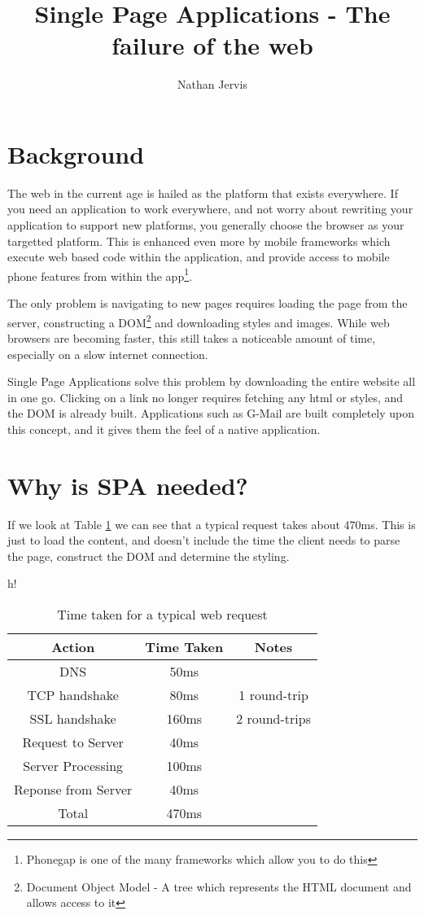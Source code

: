 \documentclass{article}[10pt]
\title{Single Page Applications - The failure of the web}
\author{Nathan Jervis}
\newcommand{\spa}{Single Page Application}
\begin{document}
\maketitle

\tableofcontents

\section{Background}

The web in the current age is hailed as the platform that exists everywhere. If you need an application to work everywhere, and not worry about rewriting your application to support new platforms, you generally choose the browser as your targetted platform. This is enhanced even more by mobile frameworks which execute web based code within the application, and provide access to mobile phone features from within the app\footnote{Phonegap is one of the many frameworks which allow you to do this}.

The only problem is navigating to new pages requires loading the page from the server, constructing a DOM\footnote{Document Object Model - A tree which represents the HTML document and allows access to it} and downloading styles and images. While web browsers are becoming faster, this still takes a noticeable amount of time, especially on a slow internet connection.

\spa s solve this problem by downloading the entire website all in one go. Clicking on a link no longer requires fetching any html or styles, and the DOM is already built. Applications such as G-Mail\cite{gmail} are built completely upon this concept, and it gives them the feel of a native application.


\section{Why is SPA needed?}

If we look at Table \ref{table:requestLength}\cite{posa} we can see that a typical request takes about 470ms. This is just to load the content, and doesn't include the time the client needs to parse the page, construct the DOM and determine the styling.
\begin{table}{h!}
\begin{tabular}{|c|c|c|}
\hline
Action & Time Taken & Notes \\\hline
DNS & 50ms\\\hline
TCP handshake & 80ms & 1 round-trip\\\hline
SSL handshake & 160ms & 2 round-trips\\\hline
Request to Server & 40ms\\\hline
Server Processing & 100ms\\\hline
Reponse from Server & 40ms\\\hline
Total & 470ms\\\hline
\end{tabular}
\caption{Time taken for a typical web request}
\label{table:requestLength}
\end{table}
\end{document}
